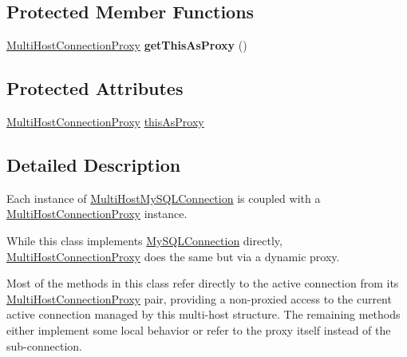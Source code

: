 \subsection*{Protected Member Functions}
\begin{DoxyCompactItemize}
\item 
\mbox{\label{classcom_1_1mysql_1_1jdbc_1_1_multi_host_my_s_q_l_connection_a331eb4b64e0b84b106ecde5b58822ecd}} 
\mbox{\hyperlink{classcom_1_1mysql_1_1jdbc_1_1_multi_host_connection_proxy}{Multi\+Host\+Connection\+Proxy}} {\bfseries get\+This\+As\+Proxy} ()
\end{DoxyCompactItemize}
\subsection*{Protected Attributes}
\begin{DoxyCompactItemize}
\item 
\mbox{\hyperlink{classcom_1_1mysql_1_1jdbc_1_1_multi_host_connection_proxy}{Multi\+Host\+Connection\+Proxy}} \mbox{\hyperlink{classcom_1_1mysql_1_1jdbc_1_1_multi_host_my_s_q_l_connection_ae5289eb21fb13d6c9c5aa62258339517}{this\+As\+Proxy}}
\end{DoxyCompactItemize}


\subsection{Detailed Description}
Each instance of \mbox{\hyperlink{classcom_1_1mysql_1_1jdbc_1_1_multi_host_my_s_q_l_connection}{Multi\+Host\+My\+S\+Q\+L\+Connection}} is coupled with a \mbox{\hyperlink{classcom_1_1mysql_1_1jdbc_1_1_multi_host_connection_proxy}{Multi\+Host\+Connection\+Proxy}} instance.

While this class implements \mbox{\hyperlink{interfacecom_1_1mysql_1_1jdbc_1_1_my_s_q_l_connection}{My\+S\+Q\+L\+Connection}} directly, \mbox{\hyperlink{classcom_1_1mysql_1_1jdbc_1_1_multi_host_connection_proxy}{Multi\+Host\+Connection\+Proxy}} does the same but via a dynamic proxy.

Most of the methods in this class refer directly to the active connection from its \mbox{\hyperlink{classcom_1_1mysql_1_1jdbc_1_1_multi_host_connection_proxy}{Multi\+Host\+Connection\+Proxy}} pair, providing a non-\/proxied access to the current active connection managed by this multi-\/host structure. The remaining methods either implement some local behavior or refer to the proxy itself instead of the sub-\/connection.

